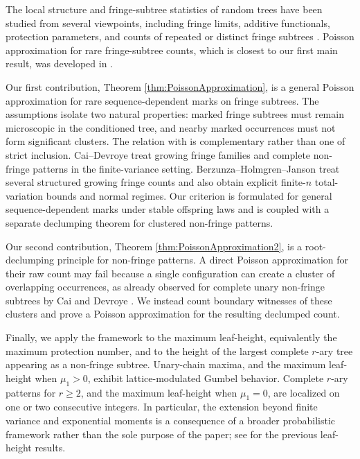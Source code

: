 \documentclass[a4paper,11pt]{article}
\DeclareRobustCommand{\1}{\mathbf{1}}
\begin{document}
The local structure and fringe-subtree statistics of random trees have been
studied from several viewpoints, including fringe limits, additive
functionals, protection parameters, and counts of repeated or distinct fringe
subtrees
\cite{Ald91,BJ01,Jan12,DJ14,DW15,Jan16,Jan21,FS22,BW22,FSW24,RR26}.
Poisson approximation for rare fringe-subtree counts, which is closest to our
first main result, was developed in \cite{CD17,BHJ26}.

Our first contribution, Theorem \ref{thm:PoissonApproximation}, is a general
Poisson approximation for rare sequence-dependent marks on fringe subtrees.
The assumptions isolate two natural properties: marked fringe subtrees must
remain microscopic in the conditioned tree, and nearby marked occurrences
must not form significant clusters. The relation with \cite{CD17,BHJ26} is complementary rather than one of strict
inclusion. Cai--Devroye treat growing fringe families and complete non-fringe
patterns in the finite-variance setting. Berzunza--Holmgren--Janson treat
several structured growing fringe counts and also obtain explicit
finite-$n$ total-variation bounds and normal regimes. Our criterion is
formulated for general sequence-dependent marks under stable offspring laws
and is coupled with a separate declumping theorem for clustered non-fringe
patterns.

Our second contribution, Theorem \ref{thm:PoissonApproximation2}, is a
root-declumping principle for non-fringe patterns. A direct Poisson
approximation for their raw count may fail because a single configuration can
create a cluster of overlapping occurrences, as already observed for complete
unary non-fringe subtrees by Cai and Devroye \cite{CD17}. We instead count
boundary witnesses of these clusters and prove a Poisson approximation for the
resulting declumped count.

Finally, we apply the framework to the maximum leaf-height, equivalently the
maximum protection number, and to the height of the largest complete $r$-ary
tree appearing as a non-fringe subtree. Unary-chain maxima, and the maximum
leaf-height when $\mu_1>0$, exhibit lattice-modulated Gumbel behavior.
Complete $r$-ary patterns for $r\ge2$, and the maximum leaf-height when
$\mu_1=0$, are localized on one or two consecutive integers. In particular,
the extension beyond finite variance and exponential moments is a consequence
of a broader probabilistic framework rather than the sole purpose of the
paper; see \cite{DGZ23,HSW24} for the previous leaf-height results.
\end{document}
